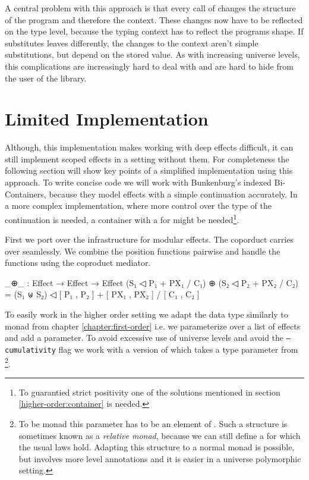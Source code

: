 A central problem with this approach is that every call of \AgdaFunction{>>=}
changes the structure of the program and therefore the context.
These changes now have to be reflected on the type level, because the typing
context has to reflect the programs shape.
If \AgdaFunction{>>=} substitutes leaves differently, the changes to the context
aren't simple substitutions, but depend on the stored value.
As with increasing universe levels, this complications are increasingly hard to
deal with and are hard to hide from the user of the library.


\section{Limited Implementation}
\label{higher-order:limited-impl}

Although, this implementation makes working with deep effects difficult, it can
still implement scoped effects in a setting without them.
For completeness the following section will show key points of a simplified
implementation using this approach.
To write concise code we will work with Bunkenburg's indexed Bi-Containers,
because they model effects with a simple continuation accurately.
In a more complex implementation, where more control over the type of the
continuation is needed, a container with a  for 
might be needed\footnote{To guarantied strict positivity one of the solutions
  mentioned in section \ref{higher-order:container} is needed.}.

First we port over the infrastructure for modular effects.
The coporduct carries over seamlessly.
We combine the position functions pairwise and handle the 
functions using the coproduct mediator.

\begin{code}
_⊕_ : Effect → Effect → Effect
(S₁ ◁ P₁ + PX₁ / C₁) ⊕ (S₂ ◁ P₂ + PX₂ / C₂) = 
  (S₁ ⊎ S₂) ◁ [ P₁ , P₂ ] + [ PX₁ , PX₂ ] / [ C₁ , C₂ ]
\end{code}
To easily work in the higher order setting we adapt the 
data type similarly to  monad from chapter
\ref{chapter:first-order} i.e. we parameterize over a list of effects and add a
 parameter.
To avoid excessive use of universe levels and avoid the \texttt{--cumulativity}
flag we work with a version of  which takes a type parameter
from \footnote{To be monad this parameter has to be an element
  of . Such a structure is sometimes known as a \textit{relative
  monad}, because we can still define a \AgdaFunction{>>=} for which the usual
  laws hold. Adapting this structure to a normal monad is possible, but involves
  more level annotations and it is easier in a universe polymorphic setting.}.

